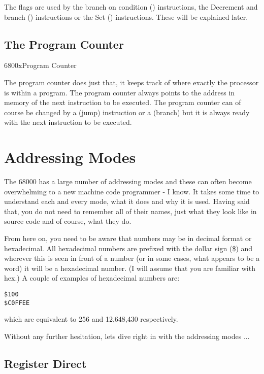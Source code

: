 The flags are used by the branch on condition ()
        instructions, the Decrement and branch () instructions or the Set
        () instructions. These will be explained later.

\subsection{The Program Counter}\mc6800x{Program Counter}

The program counter does just that, it keeps track of where
      exactly the processor is within a program. The program counter always
      points to the address in memory of the next instruction to be executed.
      The program counter can of course be changed by a  (jump) instruction
      or a  (branch) but it is always ready with the next instruction to be
      executed.

\section{Addressing Modes}
\label{ch1-addressing}%

The 68000 has a large number of addressing modes and these can often
    become overwhelming to a new machine code programmer -{} I know. It takes
    some time to understand each and every mode, what it does and why it is
    used. Having said that, you do not need to remember all of their names,
    just what they look like in source code and of course, what they
    do.

From here on, you need to be aware that numbers may be in decimal
    format or hexadecimal. All hexadecimal numbers are prefixed with the
    dollar sign (\$) and wherever this is seen in front of a number (or in some
    cases, what appears to be a word) it will be a hexadecimal number. (I will
    assume that you are familiar with hex.) A couple of examples of
    hexadecimal numbers are:

\begin{lstlisting}[frame=none,numbers=none]
$100
$C0FFEE
\end{lstlisting}

which are equivalent to 256 and 12,648,430 respectively.

Without any further hesitation, lets dive right in with the
    addressing modes ...

\subsection{Register Direct}\address{Register Direct}

